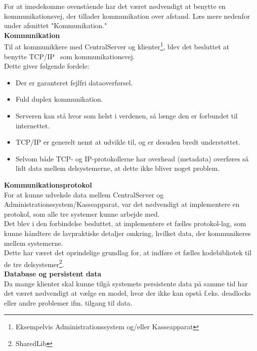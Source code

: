 For at imødekomme ovenstående har det været nødvendigt at benytte en kommunikationsvej, der tillader kommunikation over afstand. Læs mere nedenfor under afsnittet "Kommunikation."\\

\textbf{Kommunikation}\\
Til at kommunikkere med CentralServer og klienter\footnote{Eksempelvis Administrationssystem og/eller Kasseapparat}, blev det besluttet at benytte TCP/IP~\cite{TCPIP} som kommunikationsvej.\\

Dette giver følgende fordele:

\begin{itemize}
	\item Der er garanteret fejlfri dataoverførsel.
	\item Fuld duplex kommunikation.
	\item Serveren kan stå hvor som helst i verdenen, så længe den er forbundet til internettet.
	\item TCP/IP er generelt nemt at udvikle til, og er desuden bredt understøttet.
	\item Selvom både TCP- og IP-protokollerne har overhead (metadata) overføres så lidt data mellem delsystemerne, at dette ikke bliver noget problem.
\end{itemize}

\textbf{Kommunikationsprotokol}\\
For at kunne udveksle data mellem CentralServer og Administrationssystem/Kasseapparat, var det nødvendigt at implementere en protokol, som alle tre systemer kunne arbejde med.\\

Det blev i den forbindelse besluttet, at implementere et fælles protokol-lag, som kunne håndtere de lavpraktiske detaljer omkring, hvilket data, der kommunikeres mellem systemerne.\\

Dette har været det oprindelige grundlag for, at indføre et fælles kodebibliotek til de tre delsystemer\footnote{SharedLib}.\\

\textbf{Database og persistent data}\\
Da mange klienter skal kunne tilgå systemets persistente data på samme tid har det været nødvendigt at vælge en model, hvor der ikke kan opstå f.eks. deadlocks eller andre problemer ifm. tilgang til data.\\

